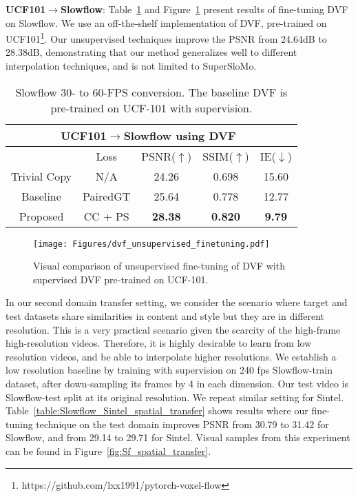 \documentclass[10pt,twocolumn,letterpaper]{article}
\renewcommand{\textrightarrow}{$\rightarrow$}
\begin{document}
\noindent\textbf{UCF101\textrightarrow Slowflow}: Table~\ref{table:Slowflow_domain_transfer_for_DVF} and Figure~\ref{fig:Slowflow_domain_transfer_for_DVF} present results of fine-tuning DVF on Slowflow. We use an off-the-shelf implementation of DVF, pre-trained on UCF101\footnote{https://github.com/lxx1991/pytorch-voxel-flow}. Our unsupervised techniques improve the PSNR from 24.64dB to 28.38dB, demonstrating that our method generalizes well to different interpolation techniques, and is not limited to SuperSloMo.
\begin{table}[h!]
\small
\centering
\begin{tabular}{c c c  c  c  }
\hline
 \multicolumn{5}{c}{\textbf{UCF101}\textrightarrow \textbf{Slowflow} using DVF~\cite{liu2017video}} \\ 
\hline
 & Loss & PSNR($\uparrow$)  & SSIM($\uparrow$) & IE($\downarrow$) \\ 
\hline
Trivial Copy  & N/A & 24.26  & 0.698  & 15.60 \\
Baseline & PairedGT & 25.64  & 0.778  & 12.77 \\
Proposed &  CC + PS & \textbf{28.38}  & \textbf{0.820}  & \textbf{9.79} \\
  \hline
\end{tabular}
\caption{Slowflow 30- to 60-FPS conversion. The baseline DVF is pre-trained on UCF-101 with supervision.}
\label{table:Slowflow_domain_transfer_for_DVF}
\end{table}

\begin{figure}[h!]
\begin{center}
   \texttt{[image: Figures/dvf\_unsupervised\_finetuning.pdf]}
\end{center}
\vspace{-0.5cm}
   \caption{Visual comparison of unsupervised fine-tuning of DVF with supervised DVF pre-trained on UCF-101.}
\label{fig:Slowflow_domain_transfer_for_DVF}
\end{figure}

In our second domain transfer setting, we consider the scenario where target and test datasets share similarities in content and style but they are in different resolution.
This is a very practical scenario given the scarcity of the high-frame high-resolution videos. Therefore, it is highly desirable to learn from low resolution videos, and be able to interpolate higher resolutions.
We establish a low resolution baseline by training with supervision on  240 fps Slowflow-train dataset, after down-sampling its frames by 4 in each dimension.
Our test video is Slowflow-test split at its original resolution. We repeat similar setting for Sintel. Table~\ref{table:Slowflow_Sintel_spatial_transfer} shows results where our fine-tuning technique on the test domain improves PSNR from 30.79 to 31.42 for Slowflow, and from 29.14 to 29.71 for Sintel.
Visual samples from this experiment can be found in Figure~\ref{fig:Sf_spatial_transfer}.
\end{document}
